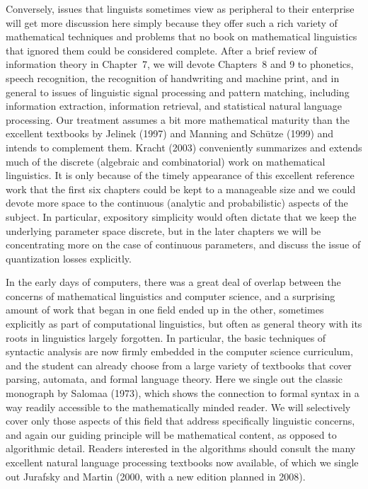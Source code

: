 Conversely, issues that linguists sometimes view as peripheral to their
enterprise will get more discussion here simply because they offer such a rich
variety of mathematical techniques and problems that no book on mathematical
linguistics that ignored them could be considered complete.  After a brief
review of information theory in Chapter~7, we will devote Chapters~8 and 9 to
phonetics, speech recognition, the recognition of handwriting and machine
print, and in general to issues of linguistic signal processing and pattern
matching, including information extraction, information retrieval, and
statistical natural language processing. Our treatment assumes a bit more
mathematical maturity than the excellent textbooks by Jelinek (1997)
\nocite{Jelinek:1997} and Manning and Sch\"{u}tze (1999) \nocite{Manning:1999}
and intends to complement them.  Kracht (2003) conveniently summarizes and
extends much of the discrete (algebraic and combinatorial) work on
mathematical linguistics.  It is only because of the timely appearance of this
excellent reference work that the first six chapters could be kept to a
manageable size and we could devote more space to the continuous (analytic and
probabilistic) aspects of the subject. In particular, expository simplicity
would often dictate that we keep the underlying parameter space discrete, but
in the later chapters we will be concentrating more on the case of continuous
parameters, and discuss the issue of quantization losses explicitly. 

In the early days of computers, there was a great deal of overlap between the
concerns of mathematical linguistics and computer science, and a surprising
amount of work that began in one field ended up in the other, sometimes
explicitly as part of computational linguistics, but often as general theory
with its roots in linguistics largely forgotten. In particular, the basic
techniques of syntactic analysis are now firmly embedded in the computer
science curriculum, and the student can already choose from a large variety of
textbooks that cover parsing, automata, and formal language theory. Here we
single out the classic monograph by \nocite{Kracht:2003} \nocite{Salomaa:1973}
Salomaa (1973), which shows the connection to formal syntax in a way readily
accessible to the mathematically minded reader. We will selectively cover only
those aspects of this field that address specifically linguistic concerns, and
again our guiding principle will be mathematical content, as opposed to
algorithmic detail. Readers interested in the algorithms should consult the
many excellent natural language processing textbooks now available, of which
we single out Jurafsky and Martin (2000, with a new edition planned in
2008). \nocite{Jurafsky:2000}

